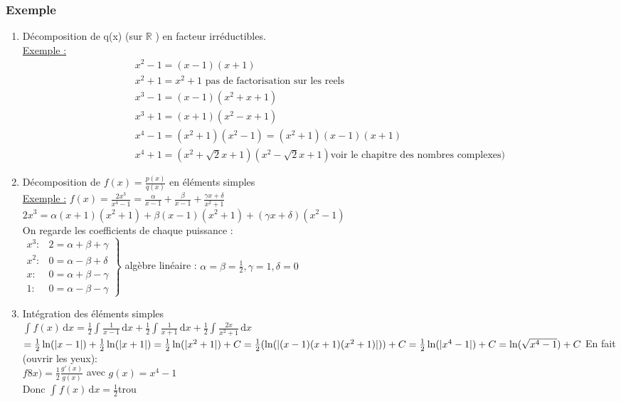 \documentclass[12pt,a4paper]{article}
\newcommand{\R}{\ensuremath{\mathbb{R}} }
\newcommand{\intx}[3]{\ensuremath{\int_{#1}^{#2} #3 \, \mathrm dx}}
\begin{document}
{\subsubsection{Exemple}
\begin{enumerate}
	\item Décomposition de q(x) (sur \R) en facteur irréductibles.\\
	 \underline{Exemple :} \begin{align*}
	 x^2-1 = (x-1)(x+1)\\
	 x^2+1 = x^2+1 \text{ pas de factorisation sur les reels}\\
	 x^3-1 = (x-1)(x^2+x+1)\\
	 x^3+1 = (x+1)(x^2-x+1)\\
	 x^4-1 = (x^2+1)(x^2-1) = (x^2+1)(x-1)(x+1)\\
	 x^4+1 =  (x^2+\sqrt{2}x + 1)(x^2-\sqrt{2}x +1) \text{voir le chapitre des nombres complexes)}
	 \end{align*}
	 \item Décomposition de $f(x) = \frac{p(x)}{q(x)}$ en éléments simples\\
	 \underline{Exemple :} $f(x) = \frac{2x^3}{x^4-1} = \frac{\alpha}{x-1} + \frac{\beta}{x-1} + \frac{\gamma x + \delta}{x^2+1}$\\
	 $2x^3 = \alpha(x+1)(x^2+1) + \beta(x-1)(x^2+1) + (\gamma x + \delta)(x^2-1)$\\
	 On regarde les coefficients de chaque puissance : \\
	 $\left.
		 \begin{array}{ll}
			 x^3 : & 2 = \alpha + \beta + \gamma\\
			 x^2 : & 0 = \alpha - \beta + \delta\\
			 x : & 0 = \alpha + \beta - \gamma\\
			 1 : & 0 = \alpha - \beta - \gamma
		 \end{array}
		\right\}$ algèbre linéaire : $\alpha = \beta = \frac{1}{2}, \gamma = 1, \delta = 0$
	\item Intégration des éléments simples\\
	$\intx{}{}{f(x)} = \frac{1}{2}\intx{}{}{\frac{1}{x-1}} + \frac{1}{2}\intx{}{}{\frac{1}{x+1}} + \frac{1}{2}\intx{}{}{\frac{2x}{x^2+1}}$\\
	$= \frac{1}{2}\ln(|x-1|) + \frac{1}{2}\ln(|x+1|) = \frac{1}{2}\ln(|x^2+1|) + C\\
	= \frac{1}{2}(\ln(|(x-1)(x+1)(x^2+1)|)) + C\\
	= \frac{1}{2}\ln(|x^4-1|) + C = \ln(\sqrt{x^4 -1}) + C$
	En fait (ouvrir les yeux):\\
	$f8x) = \frac{1}{2} \frac{g'(x)}{g(x)}$ avec $g(x) = x^4-1$\\
	Donc $\intx{}{}{f(x)} = \frac{1}{2}${trou}
\end{enumerate}
}
\end{document}
